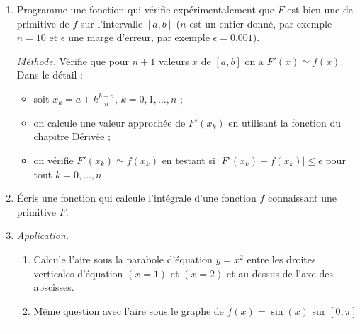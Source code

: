 \documentclass[11pt,class=report,crop=false]{standalone}
\begin{document}
\begin{activite}[Primitive]


\begin{enumerate}
  \item Programme une fonction 
  qui vérifie expérimentalement que $F$ est bien une de primitive de $f$ sur l'intervalle $[a,b]$ ($n$ est un entier donné, par exemple $n=10$ et $\epsilon$ une marge d'erreur, par exemple $\epsilon = 0.001$). 
  
  \emph{Méthode.} Vérifie que pour $n+1$ valeurs $x$ de $[a,b]$ on a
  $F'(x) \simeq f(x)$. Dans le détail :
  \begin{itemize}
    \item soit $x_k = a + k\frac{b-a}{n}$, $k=0,1,\ldots,n$ ;
    \item on calcule une valeur approchée de $F'(x_k)$ en utilisant la fonction  du chapitre \og{}Dérivée\fg{} ;
    \item on vérifie $F'(x_k) \simeq f(x_k)$ en testant si $\big| F'(x_k) - f(x_k) \big| \le \epsilon$ pour tout $k=0,\ldots,n$.
  \end{itemize}
  
   
  \item \'Ecris une fonction  qui calcule l'intégrale 
  d'une fonction $f$ connaissant une primitive $F$.
  
  \item \emph{Application.}
  \begin{enumerate}
    \item Calcule l'aire sous la parabole d'équation $y=x^2$ entre les droites verticales d'équation $(x=1)$ et $(x=2)$ et au-dessus de l'axe des abscisses.
    \item Même question avec l'aire sous le graphe de $f(x) = \sin(x)$ sur $[0,\pi]$.
  \end{enumerate}
  
\end{enumerate} 

\end{activite}

\end{document}
